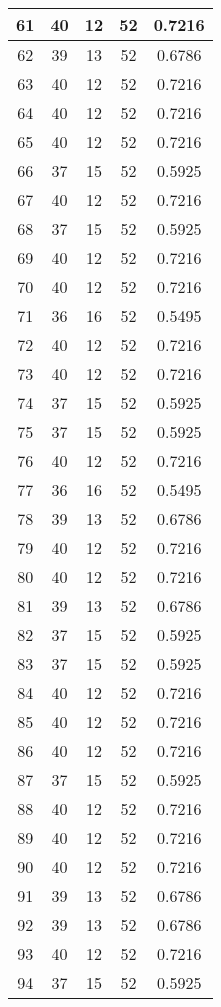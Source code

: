 \documentclass[letterpaper, 12pt]{article}
\begin{document}
\begin{longtable}{|c|c|c|c|c|}
\hline
61 & 40 & 12 & 52 & 0.7216 \\
\hline
62 & 39 & 13 & 52 & 0.6786 \\
\hline
63 & 40 & 12 & 52 & 0.7216 \\
\hline
64 & 40 & 12 & 52 & 0.7216 \\
\hline
65 & 40 & 12 & 52 & 0.7216 \\
\hline
66 & 37 & 15 & 52 & 0.5925 \\
\hline
67 & 40 & 12 & 52 & 0.7216 \\
\hline
68 & 37 & 15 & 52 & 0.5925 \\
\hline
69 & 40 & 12 & 52 & 0.7216 \\
\hline
70 & 40 & 12 & 52 & 0.7216 \\
\hline
71 & 36 & 16 & 52 & 0.5495 \\
\hline
72 & 40 & 12 & 52 & 0.7216 \\
\hline
73 & 40 & 12 & 52 & 0.7216 \\
\hline
74 & 37 & 15 & 52 & 0.5925 \\
\hline
75 & 37 & 15 & 52 & 0.5925 \\
\hline
76 & 40 & 12 & 52 & 0.7216 \\
\hline
77 & 36 & 16 & 52 & 0.5495 \\
\hline
78 & 39 & 13 & 52 & 0.6786 \\
\hline
79 & 40 & 12 & 52 & 0.7216 \\
\hline
80 & 40 & 12 & 52 & 0.7216 \\
\hline
81 & 39 & 13 & 52 & 0.6786 \\
\hline
82 & 37 & 15 & 52 & 0.5925 \\
\hline
83 & 37 & 15 & 52 & 0.5925 \\
\hline
84 & 40 & 12 & 52 & 0.7216 \\
\hline
85 & 40 & 12 & 52 & 0.7216 \\
\hline
86 & 40 & 12 & 52 & 0.7216 \\
\hline
87 & 37 & 15 & 52 & 0.5925 \\
\hline
88 & 40 & 12 & 52 & 0.7216 \\
\hline
89 & 40 & 12 & 52 & 0.7216 \\
\hline
90 & 40 & 12 & 52 & 0.7216 \\
\hline
91 & 39 & 13 & 52 & 0.6786 \\
\hline
92 & 39 & 13 & 52 & 0.6786 \\
\hline
93 & 40 & 12 & 52 & 0.7216 \\
\hline
94 & 37 & 15 & 52 & 0.5925 \\

\end{longtable}
\end{document}
